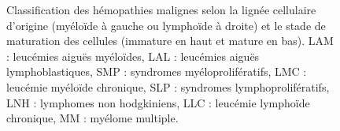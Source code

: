 \begin{figure}[H]
    \caption{
        Classification des hémopathies malignes selon la lignée cellulaire d'origine 
        (\colorbox{Rhodamine!60}{myéloïde} à gauche ou \colorbox{Purple!60}{lymphoïde} à droite) 
        et le stade de maturation des cellules (\colorbox{Gray!20}{immature} en haut et \colorbox{Gray!70}{mature} en bas).
        LAM : leucémies aiguës myéloïdes, LAL : leucémies aiguës lymphoblastiques, SMP : syndromes myéloprolifératifs, 
        LMC : leucémie myéloïde chronique, SLP : syndromes lymphoprolifératifs, LNH : lymphomes non hodgkiniens, 
        LLC : leucémie lymphoïde chronique, MM : myélome multiple.
    }
    \label{fig:hemopathies}
\end{figure}
